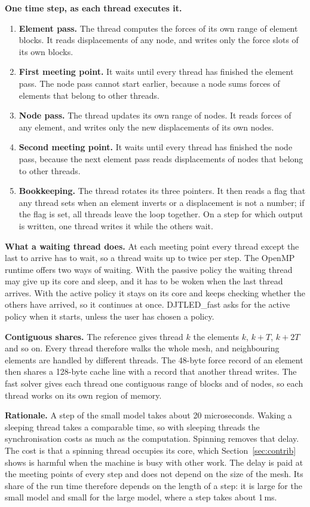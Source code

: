 \documentclass[11pt,a4paper]{article}
\newcommand{\DJF}{DJTLED\_fast}
\begin{document}
\textbf{One time step, as each thread executes it.}
\begin{enumerate}
\item \textbf{Element pass.} The thread computes the forces of its own range of element blocks. It reads displacements of any node, and writes only the force slots of its own blocks.
\item \textbf{First meeting point.} It waits until every thread has finished the element pass. The node pass cannot start earlier, because a node sums forces of elements that belong to other threads.
\item \textbf{Node pass.} The thread updates its own range of nodes. It reads forces of any element, and writes only the new displacements of its own nodes.
\item \textbf{Second meeting point.} It waits until every thread has finished the node pass, because the next element pass reads displacements of nodes that belong to other threads.
\item \textbf{Bookkeeping.} The thread rotates its three pointers. It then reads a flag that any thread sets when an element inverts or a displacement is not a number; if the flag is set, all threads leave the loop together. On a step for which output is written, one thread writes it while the others wait.
\end{enumerate}

\textbf{What a waiting thread does.} At each meeting point every thread except the last to arrive has to wait, so a thread waits up to twice per step. The OpenMP runtime offers two ways of waiting. With the passive policy the waiting thread may give up its core and sleep, and it has to be woken when the last thread arrives. With the active policy it stays on its core and keeps checking whether the others have arrived, so it continues at once. \DJF{} asks for the active policy when it starts, unless the user has chosen a policy.

\textbf{Contiguous shares.} The reference gives thread $k$ the elements $k$, $k+T$, $k+2T$ and so on. Every thread therefore walks the whole mesh, and neighbouring elements are handled by different threads. The 48-byte force record of an element then shares a 128-byte cache line with a record that another thread writes. The fast solver gives each thread one contiguous range of blocks and of nodes, so each thread works on its own region of memory.

\textbf{Rationale.} A step of the small model takes about 20 microseconds. Waking a sleeping thread takes a comparable time, so with sleeping threads the synchronisation costs as much as the computation. Spinning removes that delay. The cost is that a spinning thread occupies its core, which Section~\ref{sec:contrib} shows is harmful when the machine is busy with other work. The delay is paid at the meeting points of every step and does not depend on the size of the mesh. Its share of the run time therefore depends on the length of a step: it is large for the small model and small for the large model, where a step takes about 1\,ms.
\end{document}
